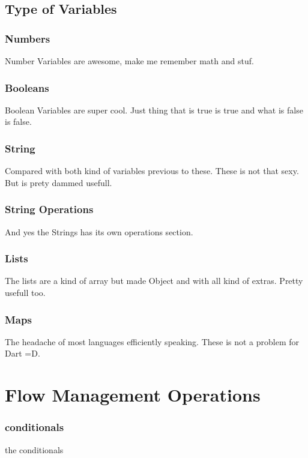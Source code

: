 \documentclass[10pt]{book}
\begin{document}
\subsection{Type of Variables}
\subsubsection{Numbers}
Number Variables are awesome, make me remember math and stuf.
\subsubsection{Booleans}
Boolean Variables are super cool. Just thing that is true is true and what is false is false.
\subsubsection{String}
Compared with both kind of variables previous to these. These is not that sexy. But is prety dammed usefull.
\subsubsection{String Operations}
And yes the Strings has its own operations section.
\subsubsection{Lists}
The lists are a kind of array but made Object and with all kind of extras. Pretty usefull too.
\subsubsection{Maps}
The headache of most languages efficiently speaking. These is not a problem for Dart =D.

\section{Flow Management Operations}
\subsubsection{conditionals}
the conditionals
\end{document}
